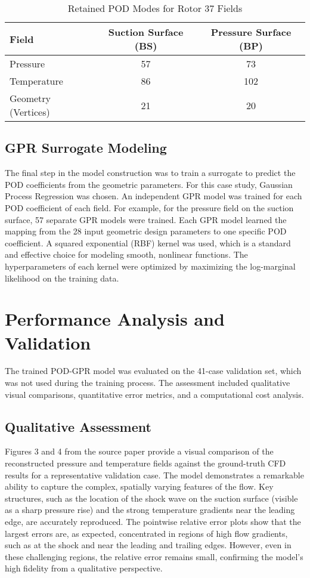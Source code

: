 \documentclass[dsc, EN]{ufabcFHZh}
\begin{document}
{\begin{table}[htbp]
  \centering
  \caption{Retained POD Modes for Rotor 37 Fields}
  \label{tab:retained_pod_modes}
  \begin{tabular}{|l|c|c|}
    \hline
    \textbf{Field} & \textbf{Suction Surface (BS)} & \textbf{Pressure Surface (BP)} \\
    \hline
    Pressure & 57 & 73 \\
    Temperature & 86 & 102 \\
    Geometry (Vertices) & 21 & 20 \\
    \hline
  \end{tabular}
\end{table}

\subsection{GPR Surrogate Modeling}

The final step in the model construction was to train a surrogate to predict the POD coefficients from the geometric parameters. For this case study, Gaussian Process Regression was chosen. An independent GPR model was trained for each POD coefficient of each field. For example, for the pressure field on the suction surface, 57 separate GPR models were trained. Each GPR model learned the mapping from the 28 input geometric design parameters to one specific POD coefficient. A squared exponential (RBF) kernel was used, which is a standard and effective choice for modeling smooth, nonlinear functions. The hyperparameters of each kernel were optimized by maximizing the log-marginal likelihood on the training data.  

\section{Performance Analysis and Validation}

The trained POD-GPR model was evaluated on the 41-case validation set, which was not used during the training process. The assessment included qualitative visual comparisons, quantitative error metrics, and a computational cost analysis.


\subsection{Qualitative Assessment}

Figures 3 and 4 from the source paper  provide a visual comparison of the reconstructed pressure and temperature fields against the ground-truth CFD results for a representative validation case. The model demonstrates a remarkable ability to capture the complex, spatially varying features of the flow. Key structures, such as the location of the shock wave on the suction surface (visible as a sharp pressure rise) and the strong temperature gradients near the leading edge, are accurately reproduced. The pointwise relative error plots show that the largest errors are, as expected, concentrated in regions of high flow gradients, such as at the shock and near the leading and trailing edges. However, even in these challenging regions, the relative error remains small, confirming the model's high fidelity from a qualitative perspective. 

}
\end{document}
